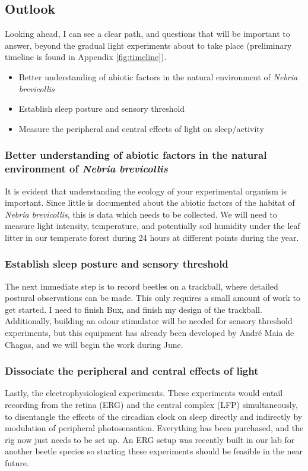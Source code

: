 \subsection{Outlook} \label{outlook}
Looking ahead, I can see a clear path, and questions that will be important to answer, beyond the gradual light experiments about to take place (preliminary timeline is found in Appendix \ref{fig:timeline}).

\begin{itemize}
    \item Better understanding of abiotic factors in the natural environment of \textit{Nebria brevicollis}
    \item Establish sleep posture and sensory threshold
    \item Measure the peripheral and central effects of light on sleep/activity
\end{itemize}

\subsubsection{Better understanding of abiotic factors in the natural environment of \textit{Nebria brevicollis}}
It is evident that understanding the ecology of your experimental organism is important. Since little is documented about the abiotic factors of the habitat of \textit{Nebria brevicollis}, this is data which needs to be collected. We will need to measure light intensity, temperature, and potentially soil humidity under the leaf litter in our temperate forest during 24 hours at different points during the year.

\subsubsection{Establish sleep posture and sensory threshold}
The next immediate step is to record beetles on a trackball, where detailed postural observations can be made. This only requires a small amount of work to get started. I need to finish Bux, and finish my design of the trackball. Additionally, building an odour stimulator will be needed for sensory threshold experiments, but this equipment has already been developed by André Maia de Chagas, and we will begin the work during June.

\subsubsection{Dissociate the peripheral and central effects of light}
Lastly, the electrophysiological experiments. These experiments would entail recording from the retina (ERG) and the central complex (LFP) simultaneously, to disentangle the effects of the circadian clock on sleep directly and indirectly by modulation of peripheral photosensation. Everything has been purchased, and the rig now just needs to be set up. An ERG setup was recently built in our lab for another beetle species so starting these experiments should be feasible in the near future.
